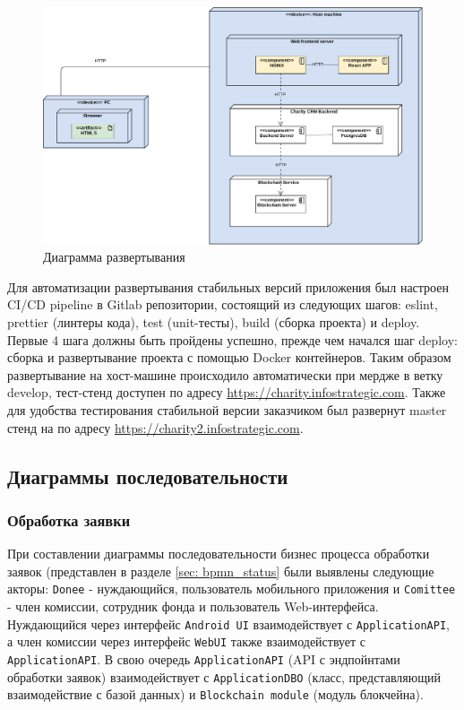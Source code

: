 \documentclass[a4paper,12pt,reqno]{article}
\begin{document}
\begin{figure}[H]
		\centering
		\includegraphics[width = 0.9\linewidth]{img/Deployment-Web.pdf}
		\caption{Диаграмма развертывания}
		\label{pic: deployment}
\end{figure}

Для автоматизации развертывания стабильных версий приложения был настроен CI/CD pipeline в Gitlab репозитории, состоящий из следующих шагов: eslint, prettier (линтеры кода), test (unit-тесты), build (сборка проекта) и deploy. Первые 4 шага должны быть пройдены успешно, прежде чем начался шаг deploy: сборка и развертывание проекта с помощью Docker контейнеров. Таким образом развертывание на хост-машине происходило автоматически при мердже в ветку develop, тест-стенд доступен по адресу \url{https://charity.infostrategic.com}. Также для удобства тестирования стабильной версии заказчиком был развернут master стенд на по адресу \url{https://charity2.infostrategic.com}.

\subsection{Диаграммы последовательности}

\subsubsection{Обработка заявки} \label{sec: sequence_status}

При составлении диаграммы последовательности бизнес процесса обработки заявок (представлен в разделе \ref{sec: bpmn_status} были выявлены следующие акторы: \texttt{Donee} - нуждающийся, пользователь мобильного приложения и \texttt{Comittee} - член комиссии, сотрудник фонда и пользователь Web-интерфейса. Нуждающийся через интерфейс \texttt{Android UI} взаимодействует с \texttt{ApplicationAPI},  а член комиссии через интерфейс \texttt{WebUI} также взаимодействует с \texttt{ApplicationAPI}. В свою очередь \texttt{ApplicationAPI} (API с эндпойнтами обработки заявок) взаимодействует с \texttt{ApplicationDBO} (класс, представляющий взаимодействие с базой данных) и \texttt{Blockchain module} (модуль блокчейна). 
\end{document}

